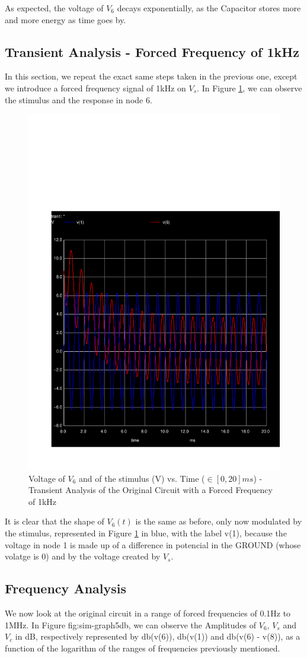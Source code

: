As expected, the voltage of $V_6$ decays exponentially, as the Capacitor stores more and more energy as time goes by.

\subsection{Transient Analysis - Forced Frequency of 1kHz}

In this section, we repeat the exact same steps taken in the previous one, except we introduce a forced frequency signal of 1kHz on $V_s$. In Figure \ref{fig:sim-graph4}, we can observe the stimulus and the response in node 6.

 

\begin{figure}[h] \centering
\includegraphics[width=0.4\linewidth]{../sim/trans4.pdf}
\caption{Voltage of $V_6$ and of the stimulus (V) vs. Time ($\in [0, 20]ms$) - Transient Analysis of the Original Circuit with a Forced Frequency of 1kHz}
\label{fig:sim-graph4}
\end{figure}

It is clear that the shape of $V_6(t)$ is the same as before, only now modulated by the stimulus, represented in Figure \ref{fig:sim-graph4} in blue, with the label v(1), because the voltage in node 1 is made up of a difference in potencial in the GROUND (whose volatge is 0) and by the voltage created by $V_s$.

\subsection{Frequency Analysis}

We now look at the original circuit in a range of forced frequencies of 0.1Hz to 1MHz. In Figure {fig:sim-graph5db}, we can observe the Amplitudes of $V_6$, $V_s$ and $V_c$ in dB, respectively represented by db(v(6)), db(v(1)) and db(v(6) - v(8)), as a function of the logarithm of the ranges of frequencies previously mentioned.

